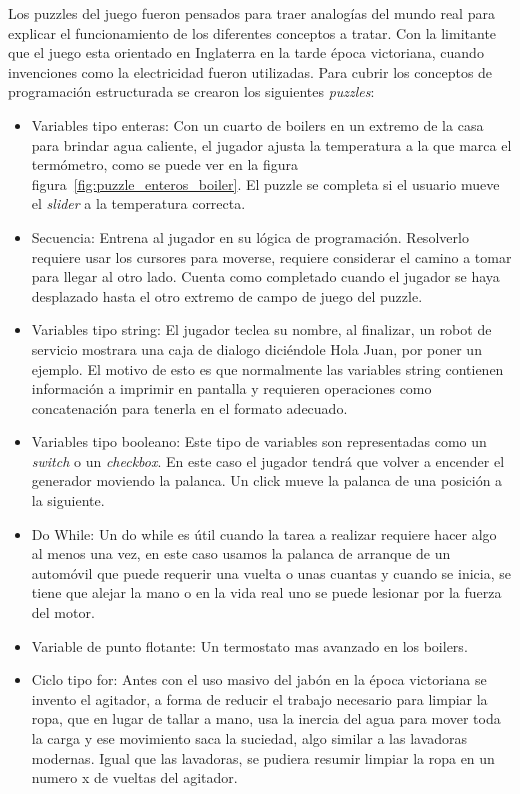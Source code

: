 Los puzzles del juego fueron pensados para traer analogías del mundo real para explicar el funcionamiento de los diferentes conceptos a tratar. Con la limitante que el juego esta orientado en Inglaterra en la tarde época victoriana, cuando invenciones como la electricidad fueron utilizadas.
Para cubrir los conceptos de programación estructurada se crearon los siguientes \textit{puzzles}:

\begin{itemize}
    \item Variables tipo enteras: Con un cuarto de boilers en un extremo de la casa para brindar agua caliente, el jugador ajusta la temperatura a la que marca el termómetro, como se puede ver en la figura figura~\ref{fig:puzzle_enteros_boiler}. El puzzle se completa si el usuario mueve el \textit{slider} a la temperatura correcta.
    \item Secuencia: Entrena al jugador en su lógica de programación. Resolverlo requiere usar los cursores para moverse, requiere considerar el camino a tomar para llegar al otro lado. Cuenta como completado cuando el jugador se haya desplazado hasta el otro extremo de campo de juego del puzzle.
    \item Variables tipo string: El jugador teclea su nombre, al finalizar, un robot de servicio mostrara una caja de dialogo diciéndole Hola Juan, por poner un ejemplo. El motivo de esto es que normalmente las variables string contienen información a imprimir en pantalla y requieren operaciones como concatenación para tenerla en el formato adecuado.
    \item  Variables tipo booleano: Este tipo de variables son representadas como un \textit{switch} o un \textit{checkbox}. En este caso el jugador tendrá que volver a encender el generador moviendo la palanca. Un click mueve la palanca de una posición a la siguiente.
    \item Do While: Un do while es útil cuando la tarea a realizar requiere hacer algo al menos una vez, en este caso usamos la palanca de arranque de un automóvil que puede requerir una vuelta o unas cuantas y cuando se inicia, se tiene que alejar la mano o en la vida real uno se puede lesionar por la fuerza del motor.
    \item Variable de punto flotante: Un termostato mas avanzado en los boilers.
    \item Ciclo tipo for: Antes con el uso masivo del jabón en la época victoriana se invento el agitador, a forma de reducir el trabajo necesario para limpiar la ropa, que en lugar de tallar a mano, usa la inercia del agua para mover toda la carga y ese movimiento saca la suciedad, algo similar a las lavadoras modernas. Igual que las lavadoras, se pudiera resumir limpiar la ropa en un numero x de vueltas del agitador.

\end{itemize}
